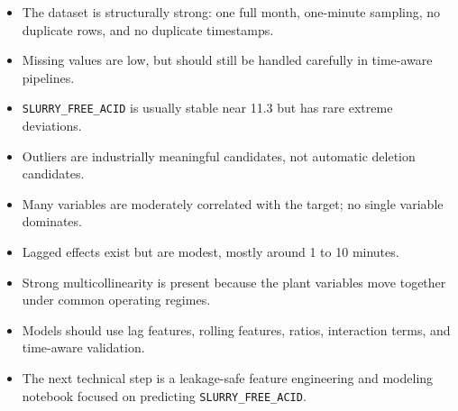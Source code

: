 \documentclass[11pt,a4paper]{article}
\begin{document}
\begin{itemize}
    \item The dataset is structurally strong: one full month, one-minute sampling, no duplicate rows, and no duplicate timestamps.
    \item Missing values are low, but should still be handled carefully in time-aware pipelines.
    \item \texttt{SLURRY\_FREE\_ACID} is usually stable near 11.3 but has rare extreme deviations.
    \item Outliers are industrially meaningful candidates, not automatic deletion candidates.
    \item Many variables are moderately correlated with the target; no single variable dominates.
    \item Lagged effects exist but are modest, mostly around 1 to 10 minutes.
    \item Strong multicollinearity is present because the plant variables move together under common operating regimes.
    \item Models should use lag features, rolling features, ratios, interaction terms, and time-aware validation.
    \item The next technical step is a leakage-safe feature engineering and modeling notebook focused on predicting \texttt{SLURRY\_FREE\_ACID}.
\end{itemize}
\end{document}
